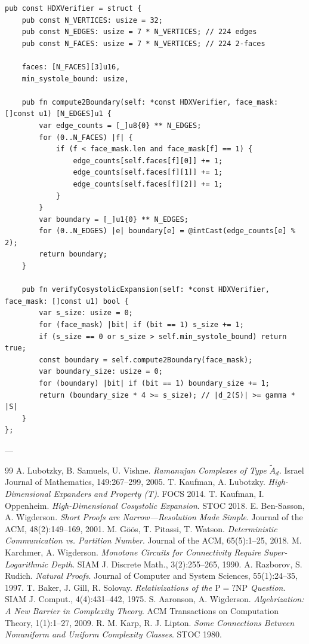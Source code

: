 \documentclass[11pt,a4paper]{article}
\theoremstyle{plain}
\theoremstyle{definition}
\theoremstyle{remark}
\begin{document}
\begin{lstlisting}[language=Zig, caption={Pure Zig 0.16.0 Bare-Silicon 2-Systole Cosystolic Verifier Kernel}]
pub const HDXVerifier = struct {
    pub const N_VERTICES: usize = 32;
    pub const N_EDGES: usize = 7 * N_VERTICES; // 224 edges
    pub const N_FACES: usize = 7 * N_VERTICES; // 224 2-faces

    faces: [N_FACES][3]u16,
    min_systole_bound: usize,

    pub fn compute2Boundary(self: *const HDXVerifier, face_mask: []const u1) [N_EDGES]u1 {
        var edge_counts = [_]u8{0} ** N_EDGES;
        for (0..N_FACES) |f| {
            if (f < face_mask.len and face_mask[f] == 1) {
                edge_counts[self.faces[f][0]] += 1;
                edge_counts[self.faces[f][1]] += 1;
                edge_counts[self.faces[f][2]] += 1;
            }
        }
        var boundary = [_]u1{0} ** N_EDGES;
        for (0..N_EDGES) |e| boundary[e] = @intCast(edge_counts[e] % 2);
        return boundary;
    }

    pub fn verifyCosystolicExpansion(self: *const HDXVerifier, face_mask: []const u1) bool {
        var s_size: usize = 0;
        for (face_mask) |bit| if (bit == 1) s_size += 1;
        if (s_size == 0 or s_size > self.min_systole_bound) return true;
        const boundary = self.compute2Boundary(face_mask);
        var boundary_size: usize = 0;
        for (boundary) |bit| if (bit == 1) boundary_size += 1;
        return (boundary_size * 4 >= s_size); // |d_2(S)| >= gamma * |S|
    }
};
\end{lstlisting}

---

\begin{thebibliography}{99}
 A. Lubotzky, B. Samuels, U. Vishne. \emph{Ramanujan Complexes of Type $\tilde{A}_d$}. Israel Journal of Mathematics, 149:267--299, 2005.
 T. Kaufman, A. Lubotzky. \emph{High-Dimensional Expanders and Property (T)}. FOCS 2014.
 T. Kaufman, I. Oppenheim. \emph{High-Dimensional Cosystolic Expansion}. STOC 2018.
 E. Ben-Sasson, A. Wigderson. \emph{Short Proofs are Narrow---Resolution Made Simple}. Journal of the ACM, 48(2):149--169, 2001.
 M. Göös, T. Pitassi, T. Watson. \emph{Deterministic Communication vs. Partition Number}. Journal of the ACM, 65(5):1--25, 2018.
 M. Karchmer, A. Wigderson. \emph{Monotone Circuits for Connectivity Require Super-Logarithmic Depth}. SIAM J. Discrete Math., 3(2):255--265, 1990.
 A. Razborov, S. Rudich. \emph{Natural Proofs}. Journal of Computer and System Sciences, 55(1):24--35, 1997.
 T. Baker, J. Gill, R. Solovay. \emph{Relativizations of the $\mathrm{P}=?\mathrm{NP}$ Question}. SIAM J. Comput., 4(4):431--442, 1975.
 S. Aaronson, A. Wigderson. \emph{Algebrization: A New Barrier in Complexity Theory}. ACM Transactions on Computation Theory, 1(1):1--27, 2009.
 R. M. Karp, R. J. Lipton. \emph{Some Connections Between Nonuniform and Uniform Complexity Classes}. STOC 1980.
\end{thebibliography}
\end{document}
